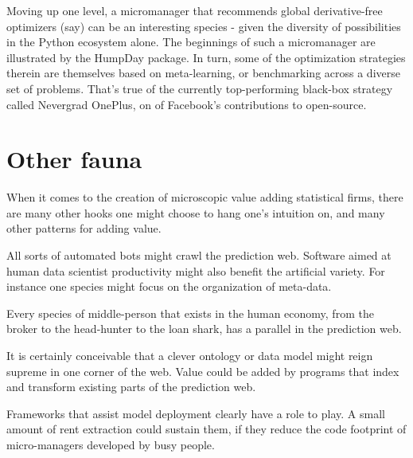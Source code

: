 Moving up one level, a micromanager that recommends global derivative-free optimizers (say) can be an interesting species - given the diversity of possibilities in the Python ecosystem alone. The beginnings of such a micromanager are illustrated by the HumpDay package. In turn, some of the optimization strategies therein are themselves based on meta-learning, or benchmarking across a diverse set of problems. That's true of the currently top-performing black-box strategy called Nevergrad OnePlus, on of Facebook's contributions to open-source.



\section{Other fauna}

When it comes to the creation of microscopic value adding statistical firms, there are many other hooks one might choose to hang one's intuition on, and many other patterns for adding value. 

All sorts of automated bots might crawl the prediction web. Software aimed at human data scientist productivity might also benefit the artificial variety. For instance one species might focus on the organization of meta-data. 

Every species of middle-person that exists in the human economy, from the broker to the head-hunter to the loan shark, has a parallel in the prediction web. 

It is certainly conceivable that a clever ontology or data model might reign supreme in one corner of the web. Value could be added by programs that index and transform existing parts of the prediction web.

Frameworks that assist model deployment clearly have a role to play. A small amount of rent extraction could sustain them, if they reduce the code footprint of micro-managers developed by busy people.

